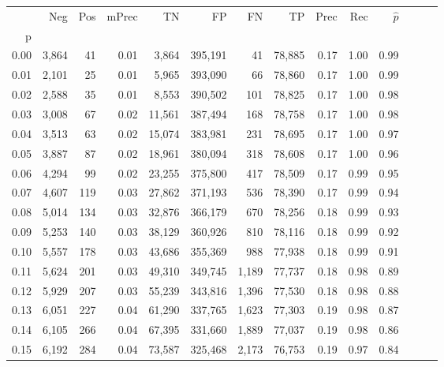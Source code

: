 \begin{tabular}{rrrrrrrrrrrrrr}
\toprule
{} &    Neg &    Pos & mPrec &       TN &       FP &      FN &      TP &  Prec &   Rec & $\hat{p}$ \\
p    &        &        &       &          &          &         &         &       &       &           \\
\midrule
0.00 &  3,864 &     41 &  0.01 &    3,864 &  395,191 &      41 &  78,885 &  0.17 &  1.00 &      0.99 \\
0.01 &  2,101 &     25 &  0.01 &    5,965 &  393,090 &      66 &  78,860 &  0.17 &  1.00 &      0.99 \\
0.02 &  2,588 &     35 &  0.01 &    8,553 &  390,502 &     101 &  78,825 &  0.17 &  1.00 &      0.98 \\
0.03 &  3,008 &     67 &  0.02 &   11,561 &  387,494 &     168 &  78,758 &  0.17 &  1.00 &      0.98 \\
0.04 &  3,513 &     63 &  0.02 &   15,074 &  383,981 &     231 &  78,695 &  0.17 &  1.00 &      0.97 \\
0.05 &  3,887 &     87 &  0.02 &   18,961 &  380,094 &     318 &  78,608 &  0.17 &  1.00 &      0.96 \\
0.06 &  4,294 &     99 &  0.02 &   23,255 &  375,800 &     417 &  78,509 &  0.17 &  0.99 &      0.95 \\
0.07 &  4,607 &    119 &  0.03 &   27,862 &  371,193 &     536 &  78,390 &  0.17 &  0.99 &      0.94 \\
0.08 &  5,014 &    134 &  0.03 &   32,876 &  366,179 &     670 &  78,256 &  0.18 &  0.99 &      0.93 \\
0.09 &  5,253 &    140 &  0.03 &   38,129 &  360,926 &     810 &  78,116 &  0.18 &  0.99 &      0.92 \\
0.10 &  5,557 &    178 &  0.03 &   43,686 &  355,369 &     988 &  77,938 &  0.18 &  0.99 &      0.91 \\
0.11 &  5,624 &    201 &  0.03 &   49,310 &  349,745 &   1,189 &  77,737 &  0.18 &  0.98 &      0.89 \\
0.12 &  5,929 &    207 &  0.03 &   55,239 &  343,816 &   1,396 &  77,530 &  0.18 &  0.98 &      0.88 \\
0.13 &  6,051 &    227 &  0.04 &   61,290 &  337,765 &   1,623 &  77,303 &  0.19 &  0.98 &      0.87 \\
0.14 &  6,105 &    266 &  0.04 &   67,395 &  331,660 &   1,889 &  77,037 &  0.19 &  0.98 &      0.86 \\
0.15 &  6,192 &    284 &  0.04 &   73,587 &  325,468 &   2,173 &  76,753 &  0.19 &  0.97 &      0.84 \\

\end{tabular}

